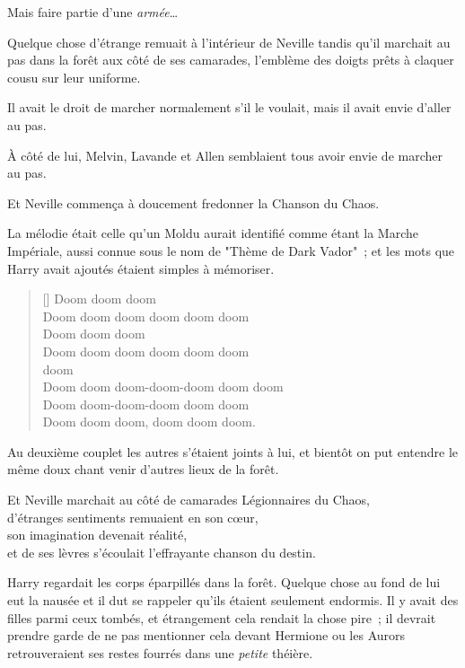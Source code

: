 Mais faire partie d'une \emph{armée}…

Quelque chose d'étrange remuait à l'intérieur de Neville tandis qu'il marchait au pas dans la forêt aux côté de ses camarades, l'emblème des doigts prêts à claquer cousu sur leur uniforme.

Il avait le droit de marcher normalement s'il le voulait, mais il avait envie d'aller au pas.

À côté de lui, Melvin, Lavande et Allen semblaient tous avoir envie de marcher au pas.

Et Neville commença à doucement fredonner la Chanson du Chaos.

La mélodie était celle qu'un Moldu aurait identifié comme étant la Marche Impériale, aussi connue sous le nom de "Thème de Dark Vador"~; et les mots que Harry avait ajoutés étaient simples à mémoriser.
\baselineskip\settowidth{\versewidth}{Doom doom doom-doom-doom doom doom} \begin{verse}[\versewidth] Doom doom doom\\ Doom doom doom doom doom doom\\ Doom doom doom\\ Doom doom doom doom doom doom\\  doom \\ Doom doom doom-doom-doom doom doom\\ Doom doom-doom-doom doom doom\\ Doom doom doom, doom doom doom. \end{verse}\baselineskip

Au deuxième couplet les autres s'étaient joints à lui, et bientôt on put entendre le même doux chant venir d'autres lieux de la forêt.

Et Neville marchait au côté de camarades Légionnaires du Chaos,\\ d'étranges sentiments remuaient en son cœur,\\ son imagination devenait réalité,\\ et de ses lèvres s'écoulait l'effrayante chanson du destin.

\later

Harry regardait les corps éparpillés dans la forêt. Quelque chose au fond de lui eut la nausée et il dut se rappeler qu'ils étaient seulement endormis. Il y avait des filles parmi ceux tombés, et étrangement cela rendait la chose pire~; il devrait prendre garde de ne pas mentionner cela devant Hermione ou les Aurors retrouveraient ses restes fourrés dans une \emph{petite} théière.

